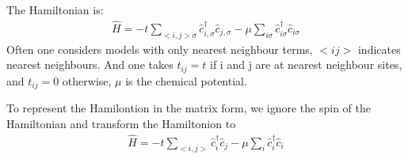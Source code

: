 \documentclass[letterpaper,10pt,english]{sphinxmanual}
\begin{document}
The Hamiltonian is:
\begin{equation*}
\begin{split}\hat{H} =-t\sum_{<i,j> \sigma}\hat{c}^{\dagger}_{i, \sigma}\hat{c}_{j, \sigma}
   -\mu\sum_{i\sigma}\hat{c}^{\dagger}_{i\sigma}\hat{c}_{i\sigma}\end{split}
\end{equation*}
Often one considers models with only nearest neighbour terms, \(<ij>\) indicates nearest
neighbours. And one takes \(t_{ij}=t\) if i and j are at nearest neighbour sites, and
\(t_{ij}=0\) otherwise, \(\mu\) is the chemical potential.

To represent the Hamilontion in the matrix form, we ignore the spin of the Hamiltonian and transform
the Hamiltonion to
\begin{equation*}
\begin{split}\hat{H} =-t\sum_{<i,j>}\hat{c}^{\dagger}_{i}\hat{c}_{j}
   -\mu\sum_{i}\hat{c}^{\dagger}_{i}\hat{c}_{i}\end{split}
\end{equation*}
\def\sphinxLiteralBlockLabel{\label{\detokenize{user_model_system:id6}}}
%
\end{document}
